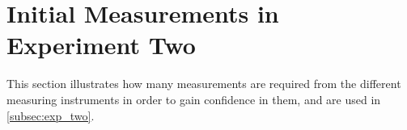 \section{Initial Measurements in Experiment Two}\label{app:exp_two_coch}

This section illustrates how many measurements are required from the different measuring instruments in order to gain confidence in them, and are used in \cref{subsec:exp_two}.


